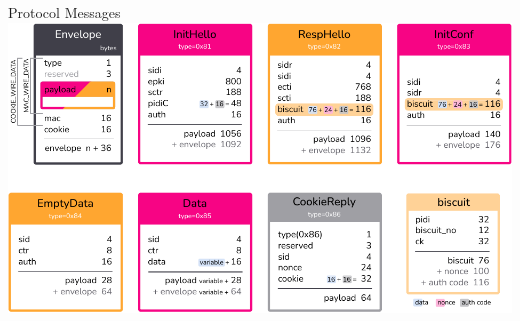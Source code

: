 \begin{frame}{Protocol Messages}
  \hypertarget{the-rosenpass-protocol-2}{}
    \includegraphics[height=.85\textheight]{graphics/rp-messages-04-all-rgb.pdf}
\end{frame}






